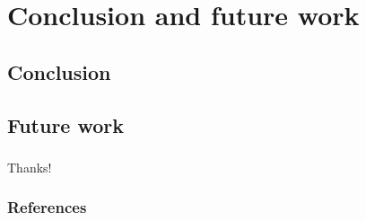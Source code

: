 \documentclass[english,xcolor={rgb,dvipsnames,table,usenames}]{beamer}
\begin{document}
\section{Conclusion and future work}

\subsection{Conclusion}

\begin{frame}
\frametitle{\subsecname}



\end{frame}


\subsection{Future work}

\begin{frame}
\frametitle{\subsecname}



\end{frame}



\begin{frame}

\Huge

Thanks!

\end{frame}


\begin{frame}[allowframebreaks]
\frametitle{References}
\begin{scriptsize}
\printbibliography
\end{scriptsize}
\end{frame}
\end{document}
